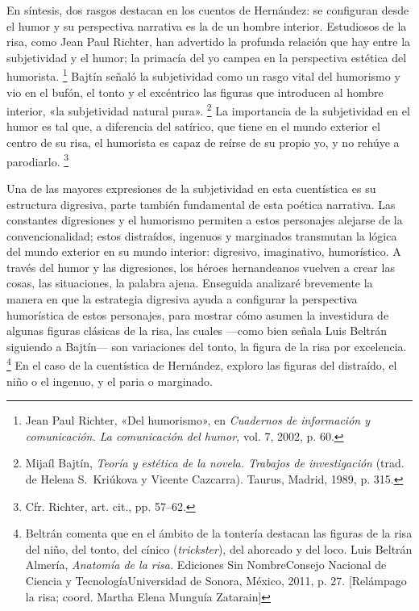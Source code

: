 \documentclass[14pt,twoside,final]{extbook} %
\let\oldfootnote\footnote
\renewcommand\footnote[1]{%
\oldfootnote{\hspace{1mm}#1}}
\begin{document}
En síntesis, dos rasgos destacan en los cuentos de Hernández: se configuran desde el humor y su perspectiva narrativa es la de un hombre interior. Estudiosos de la risa, como Jean Paul Richter, han advertido la profunda relación que hay entre la subjetividad y el humor; la primacía del yo campea en la perspectiva estética del humorista.\footnote{Jean Paul Richter, «Del humorismo», en \emph{Cuadernos de información y comunicación. La comunicación del humor,} vol. 7, 2002, p. 60.} Bajtín señaló la subjetividad como un rasgo vital del humorismo y vio en el bufón, el tonto y el excéntrico las figuras que introducen al hombre interior, «la subjetividad natural pura».\footnote{Mijaíl Bajtín, \emph{Teoría y estética de la novela. Trabajos de investigación} (trad. de Helena S.~Kriúkova y Vicente Cazcarra). Taurus, Madrid, 1989, p. 315.} La importancia de la subjetividad en el humor es tal que, a diferencia del satírico, que tiene en el mundo exterior el centro de su risa, el humorista es capaz de reírse de su propio yo, y no rehúye a parodiarlo.\footnote{Cfr. Richter, art. cit., pp. 57--62.}

Una de las mayores expresiones de la subjetividad en esta cuentística es su estructura digresiva, parte también fundamental de esta poética narrativa. Las constantes digresiones y el humorismo permiten a estos personajes alejarse de la convencionalidad; estos distraídos, ingenuos y marginados transmutan la lógica del mundo exterior en su mundo interior: digresivo, imaginativo, humorístico. A través del humor y las digresiones, los héroes hernandeanos vuelven a crear las cosas, las situaciones, la palabra ajena. Enseguida analizaré brevemente la manera en que la estrategia digresiva ayuda a configurar la perspectiva humorística de estos personajes, para mostrar cómo asumen la investidura de algunas figuras clásicas de la risa, las cuales ---como bien señala Luis Beltrán siguiendo a Bajtín--- son variaciones del tonto, la figura de la risa por excelencia.\footnote{Beltrán comenta que en el ámbito de la tontería destacan las figuras de la risa del niño, del tonto, del cínico (\emph{trickster}), del ahorcado y del loco. Luis Beltrán Almería, \emph{Anatomía de la risa.} Ediciones Sin Nombre\kernedslash* Consejo Nacional de Ciencia y Tecnología\kernedslash Universidad de Sonora, México, 2011, p. 27. [Relámpago la risa; coord. Martha Elena Munguía Zatarain]} En el caso de la cuentística de Hernández, exploro las figuras del distraído, el niño o el ingenuo, y el paria o marginado.
\end{document}
